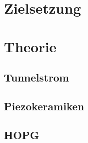 \setcounter{page}{1}
\section*{Zielsetzung}

\section{Theorie}

\subsection{Tunnelstrom}

\subsection{Piezokeramiken}

\subsection{HOPG}
